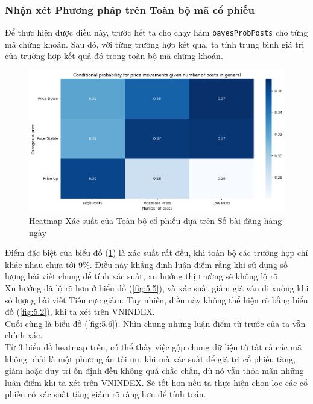 \subsubsection*{Nhận xét Phương pháp trên Toàn bộ mã cổ phiếu}

Để thực hiện được điều này, trước hết ta cho chạy hàm \texttt{bayesProbPosts} cho từng mã chứng khoán. Sau đó, với từng trường hợp kết quả, ta tính trung bình giá trị của trường hợp kết quả đó trong toàn bộ mã chứng khoán.

 \begin{figure}[H]
    \centering
    \includegraphics[width=0.9\linewidth]{images/plot-5.4-hmgenall.png}
    \caption{Heatmap Xác suất của Toàn bộ cổ phiếu dựa trên Số bài đăng hàng ngày}
    \label{fig:5.4}
\end{figure}

Điểm đặc biệt của biểu đồ (\ref{fig:5.4}) là xác suất rất đều, khi toàn bộ các trường hợp chỉ khác nhau chưa tới 9\%. Điều này khẳng định luận điểm rằng khi sử dụng số lượng bài viết chung để tính xác suất, xu hướng thị trường sẽ không lộ rõ.\\

Xu hướng đã lộ rõ hơn ở biểu đồ (\ref{fig:5.5}), và xác suất giảm giá vẫn đi xuống khi số lượng bài viết Tiêu cực giảm. Tuy nhiên, điều này không thể hiện rõ bằng biểu đồ (\ref{fig:5.2}), khi ta xét trên VNINDEX.\\

Cuối cùng là biểu đồ (\ref{fig:5.6}). Nhìn chung những luận điểm từ trước của ta vẫn chính xác.\\

Từ 3 biểu đồ heatmap trên, có thể thấy việc gộp chung dữ liệu từ tất cả các mã không phải là một phương án tối ưu, khi mà xác suất để giá trị cổ phiếu tăng, giảm hoặc duy trì ổn định đều không quá chắc chắn, dù nó vẫn thỏa mãn những luận điểm khi ta xét trên VNINDEX. Sẽ tốt hơn nếu ta thực hiện chọn lọc các cổ phiếu có xác suất tăng giảm rõ ràng hơn để tính toán. \\

